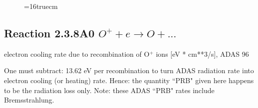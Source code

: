 \documentclass[12pt,dvips]{article}
\begin{document}
\begin{figure} \label{2.3.7rl}
\epsfxsize=16truecm 
\end{figure}
\newpage

\subsection{
  Reaction 2.3.8A0  $O^+ + e \rightarrow O   + ... $
}
electron cooling rate due to recombination of O$^+$ ions [eV *
cm**3/s], ADAS 96

One must subtract: 13.62 eV per recombination to turn ADAS radiation
rate into electron cooling (or heating) rate. Hence: the quantity
``PRB" given here happens to be the radiation loss only. Note: these
ADAS ``PRB" rates include Bremsstrahlung.
\end{document}
